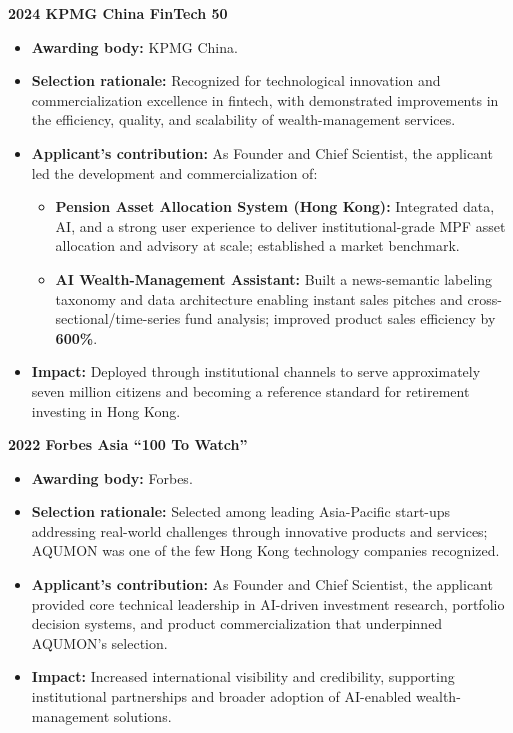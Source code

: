 \documentclass[11pt]{article}
\newenvironment{tightitemize}{%
  \begin{itemize}[leftmargin=*,nosep,topsep=2pt]
}{\end{itemize}}
\begin{document}
\noindent\textbf{2024 \quad KPMG China FinTech 50}\\
\begin{tightitemize}
  \item \textbf{Awarding body:} KPMG China.
  \item \textbf{Selection rationale:} Recognized for technological innovation and commercialization excellence in fintech, with demonstrated improvements in the efficiency, quality, and scalability of wealth-management services.
  \item \textbf{Applicant's contribution:} As Founder and Chief Scientist, the applicant led the development and commercialization of:
    \begin{tightitemize}
      \item \textbf{Pension Asset Allocation System (Hong Kong):} Integrated data, AI, and a strong user experience to deliver institutional-grade MPF asset allocation and advisory at scale; established a market benchmark.
      \item \textbf{AI Wealth-Management Assistant:} Built a news-semantic labeling taxonomy and data architecture enabling instant sales pitches and cross-sectional/time-series fund analysis; improved product sales efficiency by \textbf{600\%}.
    \end{tightitemize}
  \item \textbf{Impact:} Deployed through institutional channels to serve approximately seven million citizens and becoming a reference standard for retirement investing in Hong Kong.
\end{tightitemize}

\vspace{0.6em}

\noindent\textbf{2022 \quad Forbes Asia ``100 To Watch''}\\
\begin{tightitemize}
  \item \textbf{Awarding body:} Forbes.
  \item \textbf{Selection rationale:} Selected among leading Asia-Pacific start-ups addressing real-world challenges through innovative products and services; AQUMON was one of the few Hong Kong technology companies recognized.
  \item \textbf{Applicant's contribution:} As Founder and Chief Scientist, the applicant provided core technical leadership in AI-driven investment research, portfolio decision systems, and product commercialization that underpinned AQUMON’s selection.
  \item \textbf{Impact:} Increased international visibility and credibility, supporting institutional partnerships and broader adoption of AI-enabled wealth-management solutions.
\end{tightitemize}
\end{document}
